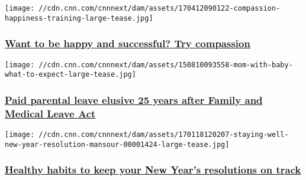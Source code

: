 \href{/2017/04/12/health/compassion-happiness-training/index.html}{}

\texttt{[image: //cdn.cnn.com/cnnnext/dam/assets/170412090122-compassion-happiness-training-large-tease.jpg]}

\hypertarget{want-to-be-happy-and-successful-try-compassion}{%
\subsubsection{\texorpdfstring{\href{/2017/04/12/health/compassion-happiness-training/index.html}{Want
to be happy and successful? Try
compassion}}{Want to be happy and successful? Try compassion}}\label{want-to-be-happy-and-successful-try-compassion}}

\href{/2018/02/05/health/paid-leave-parenting-strauss/index.html}{}

\texttt{[image: //cdn.cnn.com/cnnnext/dam/assets/150810093558-mom-with-baby-what-to-expect-large-tease.jpg]}

\hypertarget{paid-parental-leave-elusive-25-years-after-family-and-medical-leave-act}{%
\subsubsection{\texorpdfstring{\href{/2018/02/05/health/paid-leave-parenting-strauss/index.html}{Paid
parental leave elusive 25 years after Family and Medical Leave
Act}}{Paid parental leave elusive 25 years after Family and Medical Leave Act}}\label{paid-parental-leave-elusive-25-years-after-family-and-medical-leave-act}}

\href{/2017/01/20/health/staying-well-new-year-resolution-mansour/index.html}{}

\texttt{[image: //cdn.cnn.com/cnnnext/dam/assets/170118120207-staying-well-new-year-resolution-mansour-00001424-large-tease.jpg]}

\hypertarget{healthy-habits-to-keep-your-new-years-resolutions-on-track}{%
\subsubsection{\texorpdfstring{\href{/2017/01/20/health/staying-well-new-year-resolution-mansour/index.html}{Healthy
habits to keep your New Year's resolutions on
track}}{Healthy habits to keep your New Year's resolutions on track}}\label{healthy-habits-to-keep-your-new-years-resolutions-on-track}}

\href{/2016/07/14/health/stop-being-annoyed-wisdom-project/index.html}{}

